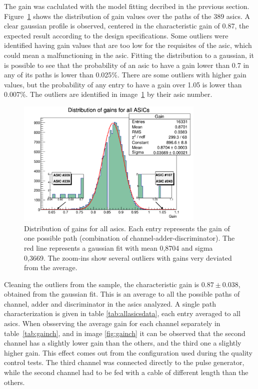 \documentclass[main.tex]{subfiles}
\begin{document}
The gain was caclulated with the model fitting decribed in the previous section. Figure~\ref{fig:gaindist} shows the distribution of gain values over the paths of the 389 asics. A clear gaussian profile is observed, centered in the characteristic gain of 0.87, the expected result according to the design specifications. Some outliers were identified having gain values that are too low for the requisites of the \gls{asic}, which could mean a malfunctioning in the \gls{asic}. Fitting the distribution to a gaussian, it is possible to see that the probability of an \gls{asic} to have a gain lower than 0.7 in any of its paths is lower than 0.025\%. There are some outliers with higher gain values, but the probability of any entry to have a gain over 1.05 is lower than 0.007\%. The outliers are identified in image~\ref{fig:gaindist} by their \gls{asic} number.
\\
\begin{figure}[h]
  \centering
  \includegraphics[width=0.8\textwidth]{./Pictures/gaindistribution.pdf}
  \caption{Distribution of gains for all \glspl{asic}. Each entry represents the gain of one possible path (combination of channel-adder-discriminator). The red line represents a gaussian fit with mean 0,8704 and sigma 0,3669.
    The zoom-ins show several outliers with gains very deviated from the average.}
  \label{fig:gaindist}
\end{figure}

Cleaning the outliers from the sample, the characteristic gain is $0.87 \pm 0.038$, obtained from the gaussian fit. This is an average to all the possible paths of channel, adder and discriminator in the \glspl{asic} analyzed. A single path characterization is given in table \ref{tab:allasicsdata}, each entry averaged to all \glspl{asic}.
When obsserving the average gain for each channel separately in table~\ref{tab:gainch}, and in image \ref{fig:gainch} it can be observed that the second channel has a slightly lower gain than the others, and the third one a slightly higher gain. This effect comes out from the configuration used during the quality control tests. The third channel was connected directly to the pulse generator, while the second channel had to be fed with a cable of different length than the others.
\end{document}
